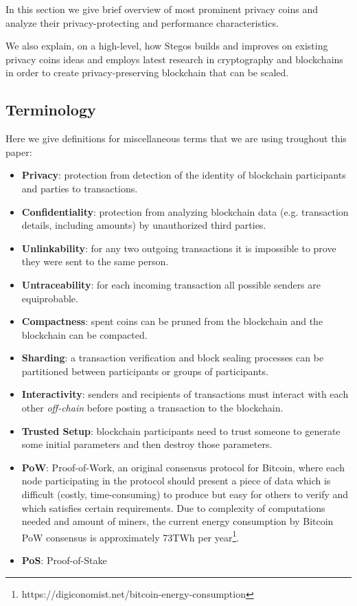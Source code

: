 \documentclass[a4paper, 10pt, conference]{ieeeconf}
\begin{document}
In this section we give brief overview of most prominent privacy coins and analyze their privacy-protecting and performance characteristics.

We also explain, on a high-level, how Stegos builds and improves on existing privacy coins ideas and employs latest research in cryptography and blockchains in order to create privacy-preserving blockchain that can be scaled. 

\subsection{Terminology}

Here we give definitions for miscellaneous terms that we are using troughout this paper:

\begin{itemize}

\item \textbf{Privacy}: protection from detection of the identity of blockchain participants and parties to transactions.
\item \textbf{Confidentiality}: protection from analyzing blockchain data (e.g. transaction details, including amounts) by unauthorized third parties.
\item \textbf{Unlinkability}: for any two outgoing transactions it is impossible to prove they were sent to the same person\cite{c2}.
\item \textbf{Untraceability}: for each incoming transaction all possible senders are equiprobable\cite{c2}.
\item \textbf{Compactness}: spent coins can be pruned from the blockchain and the blockchain can be compacted.
\item \textbf{Sharding}: a transaction verification and block sealing processes can be partitioned between participants or groups of participants.
\item \textbf{Interactivity}: senders and recipients of transactions must interact with each other \textit{off-chain} before posting a transaction to the blockchain.
\item \textbf{Trusted Setup}: blockchain participants need to trust someone to generate some initial parameters and then destroy those parameters.
\item \textbf{PoW}: Proof-of-Work, an original consensus protocol for Bitcoin, where each node participating in the protocol should present a piece of data which is difficult (costly, time-consuming) to produce but easy for others to verify and which satisfies certain requirements. Due to complexity of computations needed and amount of miners, the current energy consumption by Bitcoin PoW consensus is approximately 73TWh per year\footnote{https://digiconomist.net/bitcoin-energy-consumption}.
\item \textbf{PoS}: Proof-of-Stake

\end{itemize}
\end{document}
